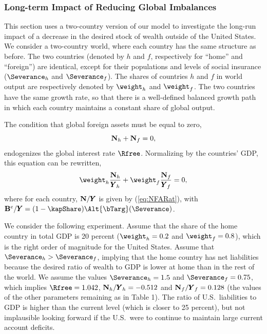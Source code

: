 \documentclass[titlepage]{\econtex}\newcommand{\texname}{cjSOE}
\renewcommand{\GDPLev}{\ensuremath{\pmb{Y}}}
\begin{document}
\medskip

\subsubsection{Long-term Impact of Reducing Global Imbalances}

This section uses a two-country version of our model to investigate the long-run impact of a decrease in the desired stock of wealth outside of the United States. We consider a two-country world, where each country has the same structure as before. The two countries (denoted by $h$ and $f$, respectively for ``home'' and ``foreign'') are identical, except for their populations and levels of social insurance ($\Severance_h$ and $\Severance_f$). The shares of countries $h$ and $f$ in world output are respectively denoted by $\weight_h$ and $\weight_f$. The two countries have the same growth rate, so that there is a well-defined balanced growth path in which each country maintains a constant share of global output.

The condition that global foreign assets must be equal to zero,
\begin{equation*}
\mathbf{N}_h+\mathbf{N}_f=0,
\end{equation*}
endogenizes the global interest rate $\Rfree$. Normalizing by the countries' GDP, this equation can be rewritten,
\begin{equation*}
\weight_h \frac{\NFALev_h}{\GDPLev_h}+\weight_f \frac{\NFALev_f}{\GDPLev_f}=0,
\end{equation*}
where for each country, $\NFALev/\GDPLev$ is given by (\ref{eq:NFARat}), with $\BLevE/\GDPLev=(1-\kapShare)\Alt{\bTarg}(\Severance)$.

We consider the following experiment. Assume that the share of the
home country in total GDP is 20 percent ($\weight_h=0.2$ and
$\weight_f=0.8$), which is the right order of magnitude for the United
States. Assume that $\Severance_h > \Severance_f$, implying that the home
country has net liabilities because the desired ratio of wealth to GDP
is lower at home than in the rest of the world. We assume the values
$\Severance_h=1.5$ and $\Severance_f=0.75$, which implies $\Rfree=1.042$,
$\NFALev_h/\GDPLev_h=-0.512$ and $\NFALev_f/\GDPLev_f=0.128$ (the
values of the other parameters remaining as in Table 1). The ratio of
U.S.\ liabilities to GDP is higher than the current level (which is
closer to 25 percent), but not implausible looking forward if the
U.S.\ were to continue to maintain large current account deficits.
\end{document}

